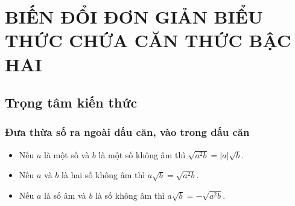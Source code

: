 \setcounter{section}{3}
\section{BIẾN ĐỔI ĐƠN GIẢN BIỂU THỨC CHỨA CĂN THỨC BẬC HAI}
\subsection{Trọng tâm kiến thức}
\begin{tomtat}
\subsubsection{Đưa thừa số ra ngoài dấu căn, vào trong dấu căn}
\begin{boxdn}
	\begin{itemize}
	\item Nếu $a$ là một số và $b$ là một số không âm thì $\sqrt{a^2b}=|a|\sqrt{b}$.
	\item Nếu $a$ và $b$ là hai số không âm thì $a\sqrt{b}=\sqrt{a^2b}$.
	\item Nếu $a$ là số âm và $b$ là số không âm thì $a\sqrt{b}=-\sqrt{a^2b}$.
	\end{itemize}
\end{boxdn}

\end{tomtat}
